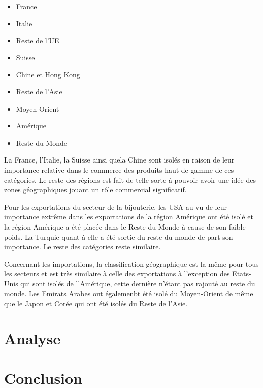 \documentclass[french,10pt,a4paper]{article}
\begin{document}
\begin{itemize}
\item France 
\item Italie
\item Reste de l'UE
\item Suisse
\item Chine et Hong Kong
\item Reste de l'Asie
\item Moyen-Orient
\item Amérique
\item Reste du Monde
\end{itemize}

La France, l'Italie, la Suisse ainsi quela Chine sont isolés en raison de leur importance relative dans le commerce des produits haut de gamme de ces catégories. Le reste des régions est fait de telle sorte à pouvoir avoir une idée des zones géographiques jouant un rôle commercial significatif.

Pour les exportations du secteur de la bijouterie, les USA au vu de leur importance extrême dans les exportations de la région \og Amérique\fg{} ont été isolé et la région \og Amérique\fg{} a été placée dans le \og Reste du Monde\fg{} à cause de son faible poids. La \og Turquie\fg{} quant à elle a été sortie du \og reste du monde\fg{} de part son importance. Le reste des catégories reste similaire.

Concernant les importations, la classification géographique est la même pour tous les secteurs et est très similaire à celle des exportations à l'exception des Etats-Unis qui sont isolés de l'Amérique, cette dernière n'étant pas rajouté au reste du monde. Les Emirats Arabes ont égalemenbt été isolé du Moyen-Orient de même que le Japon et Corée qui ont été isolés du \og Reste de l'Asie\fg{}. 


\section{Analyse}

\section{Conclusion}




\newpage


\end{document}
